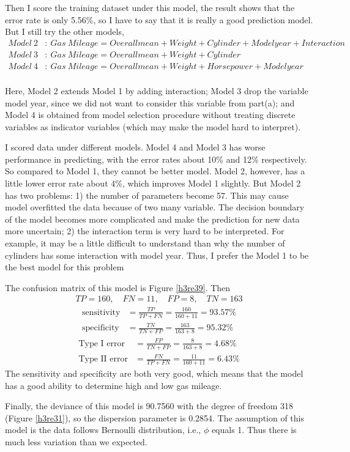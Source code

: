 \documentclass[letterpaper, 12pt]{article}
\newcommand{\ba}{$$\begin{aligned}}
\newcommand{\ea}{\end{aligned}$$}
\begin{document}
Then I score the training dataset under this model, the result shows that the error rate is only 5.56\%, so I have to say that it is really a good prediction model. But I still try the other models,
\ba
Model~2&:~Gas~Mileage=Overallmean+Weight+Cylinder+Modelyear+Interaction\\
Model~3&:~Gas~Mileage=Overallmean+Weight+Cylinder\\
Model~4&:~Gas~Mileage=Overallmean+Weight+Horsepower+Modelyear\\
\ea

Here, Model 2 extends Model 1 by adding interaction; Model 3 drop the variable model year, since we did not want to consider this variable from part(a); and Model 4 is obtained from model selection procedure without treating discrete variables as indicator variables (which may make the model hard to interpret). 

I scored data under different models. Model 4 and Model 3 has worse performance in predicting, with the error rates about 10\% and 12\% respectively. So compared to Model 1, they cannot be better model. Model 2, however, has a little lower error rate about 4\%, which improves Model 1 slightly. But Model 2 has two problems: 1) the number of parameters become 57. This may cause model overfitted the data because of two many variable. The decision boundary of the model becomes more complicated and make the prediction for new data more uncertain; 2) the interaction term is very hard to be interpreted. For example, it may be a little difficult to understand than why the number of cylinders has some interaction with model year. Thus, I prefer the Model 1 to be the best model for this problem

The confusion matrix of this model is Figure \ref{h3re39}. Then
\ba
TP=160,\quad FN=11,\quad FP=8,\quad TN=163
\ea
\ba
\text{sensitivity}&=\frac{TP}{TP+FN}=\frac{160}{160+11}=93.57\%\\
\text{specificity}&=\frac{TN}{TN+FP}=\frac{163}{163+8}=95.32\%
\ea
\ba
\text{Type I error}&=\frac{FP}{TN+FP}=\frac{8}{163+8}=4.68\%\\
\text{Type II error}&=\frac{FN}{TP+FN}=\frac{11}{160+11}=6.43\%
\ea
The sensitivity and specificity are both very good, which means that the model has a good ability to determine high and low gas mileage.


Finally, the deviance of this model is 90.7560 with the degree of freedom 318 (Figure \ref{h3re31}), so the dispersion parameter is 0.2854. The assumption of this model is the data follows Bernoulli distribution, i.e., $\phi$ equals 1. Thus there is much less variation than we expected.
\end{document}
